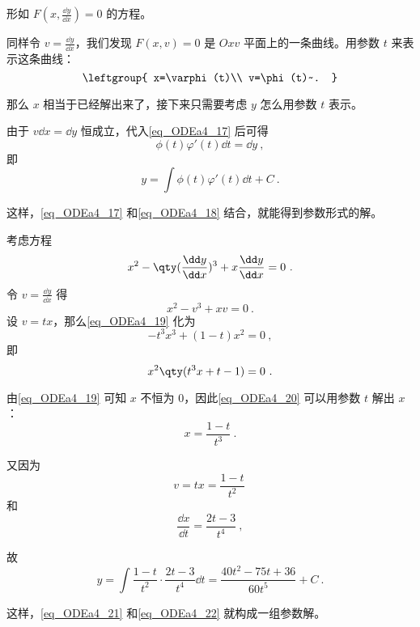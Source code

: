 形如 $F(x, \frac{\dd y}{\dd x})=0$ 的方程。

同样令 $v=\frac{\dd y}{\dd x}$，我们发现 $F(x, v)=0$ 是 $Oxv$ 平面上的一条曲线。用参数 $t$ 来表示这条曲线：
\begin{equation}\label{eq_ODEa4_17}
\leftgroup{
    x=\varphi(t)\\
    v=\phi(t)~.
}
\end{equation}

那么 $x$ 相当于已经解出来了，接下来只需要考虑 $y$ 怎么用参数 $t$ 表示。

由于 $v\dd x=\dd y$ 恒成立，代入\autoref{eq_ODEa4_17} 后可得
\begin{equation}
\phi(t)\varphi'(t)\dd t=\dd y~,
\end{equation}
即
\begin{equation}\label{eq_ODEa4_18}
y=\int \phi(t)\varphi'(t)\dd t+C~.
\end{equation}

这样，\autoref{eq_ODEa4_17} 和\autoref{eq_ODEa4_18} 结合，就能得到参数形式的解。

\begin{example}{}
考虑方程
\begin{equation}
x^2-\qty(\frac{\dd y}{\dd x})^3+x\frac{\dd y}{\dd x}=0~.
\end{equation}
令 $v=\frac{\dd y}{\dd x}$ 得
\begin{equation}\label{eq_ODEa4_19}
x^2-v^3+xv=0~.
\end{equation}
设 $v=tx$，那么\autoref{eq_ODEa4_19} 化为
\begin{equation}
-t^3x^3+(1-t)x^2=0~,
\end{equation}
即
\begin{equation}\label{eq_ODEa4_20}
x^2\qty(t^3x+t-1)=0~.
\end{equation}

由\autoref{eq_ODEa4_19} 可知 $x$ 不恒为 $0$，因此\autoref{eq_ODEa4_20} 可以用参数 $t$ 解出 $x$：
\begin{equation}\label{eq_ODEa4_21}
x=\frac{1-t}{t^3}~.
\end{equation}

又因为
\begin{equation}
v=tx=\frac{1-t}{t^2}~
\end{equation}
和
\begin{equation}
\frac{\dd x}{\dd t}=\frac{2t-3}{t^4}~,
\end{equation}

故
\begin{equation}\label{eq_ODEa4_22}
y=\int \frac{1-t}{t^2}\cdot\frac{2t-3}{t^4}\dd t=\frac{40t^2-75t+36}{60t^5}+C~.
\end{equation}

这样，\autoref{eq_ODEa4_21} 和\autoref{eq_ODEa4_22} 就构成一组参数解。



\end{example}



